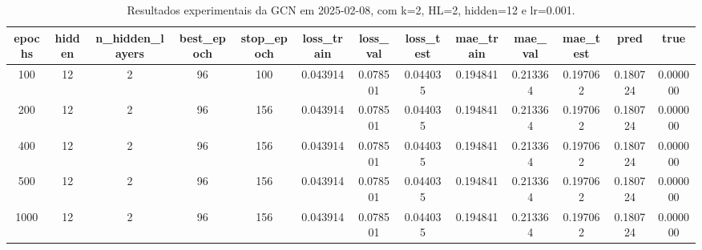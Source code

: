 \begin{table}[h]
\centering
\caption{Resultados experimentais da GCN em 2025-02-08, com k=2, HL=2, hidden=12 e lr=0.001.}
\label{tab:gcn_results_k2_hl2_h12_d20250208}
\begin{tabular}{ccccccccccccc}
\toprule
epochs & hidden & n\_hidden\_layers & best\_epoch & stop\_epoch & loss\_train & loss\_val & loss\_test & mae\_train & mae\_val & mae\_test & pred & true \\
\midrule
100 & 12 & 2 & 96 & 100 & 0.043914 & 0.078501 & 0.044035 & 0.194841 & 0.213364 & 0.197062 & 0.180724 & 0.000000 \\
200 & 12 & 2 & 96 & 156 & 0.043914 & 0.078501 & 0.044035 & 0.194841 & 0.213364 & 0.197062 & 0.180724 & 0.000000 \\
400 & 12 & 2 & 96 & 156 & 0.043914 & 0.078501 & 0.044035 & 0.194841 & 0.213364 & 0.197062 & 0.180724 & 0.000000 \\
500 & 12 & 2 & 96 & 156 & 0.043914 & 0.078501 & 0.044035 & 0.194841 & 0.213364 & 0.197062 & 0.180724 & 0.000000 \\
1000 & 12 & 2 & 96 & 156 & 0.043914 & 0.078501 & 0.044035 & 0.194841 & 0.213364 & 0.197062 & 0.180724 & 0.000000 \\
\bottomrule
\end{tabular}
\end{table}
